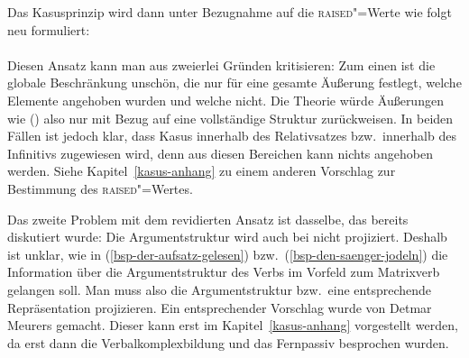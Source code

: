 Das Kasusprinzip wird dann unter Bezugnahme auf die \textsc{raised}"=Werte wie folgt neu formuliert:
\eal
\label{case-prz-zwei}
\ex {} \impl \\
    \mbox{}\hfill{}
\ex {} \impl \\
    \mbox{}\hfill{}
\zl
Diesen Ansatz kann man aus zweierlei Gründen kritisieren: Zum einen ist die globale Beschränkung
unschön, die nur für eine gesamte Äußerung festlegt, welche Elemente angehoben wurden und welche nicht.
Die Theorie würde Äußerungen wie () also nur mit Bezug auf eine vollständige Struktur zurückweisen.
\eal
{}
\zl
In beiden Fällen ist jedoch klar, dass Kasus innerhalb des Relativsatzes bzw.\
innerhalb des Infinitivs zugewiesen wird, denn aus diesen Bereichen kann nichts angehoben werden. 
Siehe Kapitel~\ref{kasus-anhang} zu einem anderen Vorschlag zur Bestimmung des \textsc{raised}"=Wertes.

Das zweite Problem mit dem revidierten Ansatz ist dasselbe, das bereits diskutiert
wurde: Die Argumentstruktur wird auch bei \citet[80]{Prze99b} nicht projiziert. Deshalb ist
unklar, wie in (\ref{bsp-der-aufsatz-gelesen}) bzw.\ (\ref{bsp-den-saenger-jodeln})
die Information über die Argumentstruktur des Verbs im Vorfeld zum
Matrixverb gelangen soll. Man muss also die Argumentstruktur bzw.\ eine entsprechende
Repräsentation projizieren. Ein entsprechender Vorschlag wurde von Detmar Meurers gemacht.
Dieser kann erst im Kapitel~\ref{kasus-anhang} vorgestellt werden, da erst dann 
die Verbalkomplexbildung und das Fernpassiv besprochen wurden.




